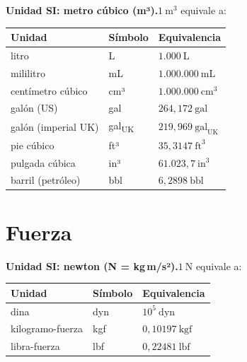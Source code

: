 \documentclass[12pt, letterpaper]{article}
\begin{document}
\begin{cuadroteoria}
    \textbf{Unidad SI: metro cúbico (m³).}\quad $1\ \text{m}^{3}$ equivale a:
    \begin{center}
        \begin{tabular}{lll}
            \toprule
            \textbf{Unidad}     & \textbf{Símbolo}      & \textbf{Equivalencia}               \\
            \midrule
            litro               & L                     & $1{.}000\ \text{L}$                 \\
            mililitro           & mL                    & $1{.}000{.}000\ \text{mL}$          \\
            centímetro cúbico   & cm³                   & $1{.}000{.}000\ \text{cm}^{3}$      \\
            galón (US)          & gal                   & $264{,}172\ \text{gal}$             \\
            galón (imperial UK) & gal\textsubscript{UK} & $219{,}969\ \text{gal}_{\text{UK}}$ \\
            pie cúbico          & ft³                   & $35{,}3147\ \text{ft}^{3}$          \\
            pulgada cúbica      & in³                   & $61{.}023{,}7\ \text{in}^{3}$       \\
            barril (petróleo)   & bbl                   & $6{,}2898\ \text{bbl}$              \\
            \bottomrule
        \end{tabular}
    \end{center}
\end{cuadroteoria}

\section{Fuerza}

\begin{cuadroteoria}
    \textbf{Unidad SI: newton (N = kg\,m/s²).}\quad $1\ \text{N}$ equivale a:
    \begin{center}
        \begin{tabular}{lll}
            \toprule
            \textbf{Unidad}  & \textbf{Símbolo} & \textbf{Equivalencia}   \\
            \midrule
            dina             & dyn              & $10^{5}\ \text{dyn}$    \\
            kilogramo-fuerza & kgf              & $0{,}10197\ \text{kgf}$ \\
            libra-fuerza     & lbf              & $0{,}22481\ \text{lbf}$ \\
            \bottomrule
        \end{tabular}
    \end{center}
\end{cuadroteoria}
\end{document}

